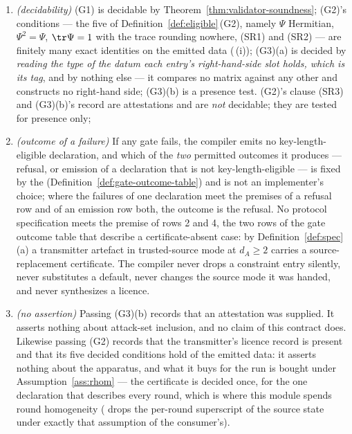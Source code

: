 \begin{theorem}\label{thm:gates}
\begin{enumerate}[label=(\roman*),leftmargin=2.2em]
\item \emph{(decidability)} (G1) is decidable by Theorem~\ref{thm:validator-soundness}; (G2)'s
conditions --- the five of Definition~\ref{def:eligible}\,(G2), namely $\Psi$
Hermitian, $\Psi^2=\Psi$, $\tr\Psi=1$ with the trace rounding nowhere, (SR1)
and (SR2) --- are finitely many exact identities on the emitted data
(\,(i)); (G3)(a) is decided by
\emph{reading the type of the datum each entry's right-hand-side slot holds,
which is its tag}, and by nothing else --- it compares no matrix against any
other and constructs no right-hand side; (G3)(b) is a presence test. (G2)'s
clause (SR3) and (G3)(b)'s record are attestations and are \emph{not}
decidable; they are tested for presence only;
\item \emph{(outcome of a failure)} If any gate fails, the compiler emits no
key-length-eligible declaration, and which of the \emph{two} permitted
outcomes it produces --- refusal, or emission of a declaration that is not
key-length-eligible --- is fixed by the 
(Definition~\ref{def:gate-outcome-table}) and is not an
implementer's choice; where the failures of one declaration meet the premises
of a refusal row and of an emission row both, the outcome is the refusal. No
protocol specification meets the premise of rows 2 and 4, the two rows of the
gate outcome table that describe a certificate-absent case: by
Definition~\ref{def:spec}\,(a) a transmitter artefact in trusted-source mode at
$d_A\ge2$ carries a source-replacement certificate. The compiler
never drops a constraint entry silently, never
substitutes a default, never changes the source mode it was handed, and never
synthesizes a licence.
\item \emph{(no assertion)} Passing (G3)(b) records that an attestation was
supplied. It asserts nothing about attack-set inclusion, and no claim of this
contract does. Likewise passing (G2) records that the transmitter's licence
record is present and that its five decided conditions hold of the emitted
data: it asserts nothing about the apparatus, and what it buys for the run is
bought under Assumption~\ref{ass:rhom} --- the certificate is decided once, for
the one declaration that describes every round, which is where this module
spends round homogeneity ( drops the per-round
superscript of the source state under exactly that assumption of the
consumer's).
\end{enumerate}


\end{theorem}

